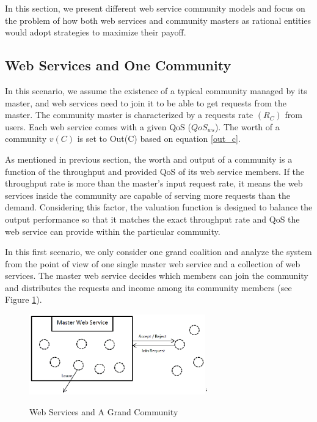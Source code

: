 \documentclass[10pt,journal,cspaper,compsoc]{IEEEtran}
\begin{document}
In this section, we present different web service community models
and focus on the problem of how both web services and community
masters as rational entities would adopt strategies to maximize
their payoff.

\subsection {Web Services and One Community}

In this scenario, we assume the existence of a typical community
managed by its master, and web services need to join it to be able
to get requests from the master. The community master is
characterized by a requests rate $(R_{C})$ from users. Each web
service comes with a given QoS ($QoS_{ws}$). The worth of a community
$v(C)$ is set to Out(C) based on equation \ref{out_c}.

As mentioned in previous section, the worth and output of a
community  is a function of the
throughput and provided QoS of its web service members. If the throughput rate is more than
the master's input request rate, it means the web services inside
the community are capable of serving more requests than the
demand. Considering this factor, the valuation function is
designed to balance the output performance so that it matches the
exact throughput rate and QoS the web service can provide within
the particular community.

In this first scenario, we only consider one grand coalition and
analyze the system from the point of view of one single master web
service and a collection of web services. The master web service
decides which members can join
the community and distributes the requests and income among its
community members (see Figure \ref{fig_sim1}).

\begin{figure}[!t]
\centering
\includegraphics[width=3in]{s1.eps}`
\caption{Web Services and A Grand Community}
\label{fig_sim1}
\end{figure}
\end{document}
